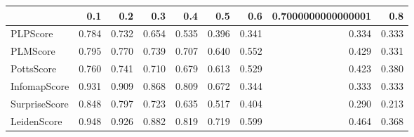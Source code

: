 \begin{tabular}{lrrrrrrrr}
\toprule
{} &   0.1 &   0.2 &   0.3 &   0.4 &   0.5 &   0.6 & 0.7000000000000001 &   0.8 \\
\midrule
PLPScore      & 0.784 & 0.732 & 0.654 & 0.535 & 0.396 & 0.341 &              0.334 & 0.333 \\
PLMScore      & 0.795 & 0.770 & 0.739 & 0.707 & 0.640 & 0.552 &              0.429 & 0.331 \\
PottsScore    & 0.760 & 0.741 & 0.710 & 0.679 & 0.613 & 0.529 &              0.423 & 0.380 \\
InfomapScore  & 0.931 & 0.909 & 0.868 & 0.809 & 0.672 & 0.344 &              0.333 & 0.333 \\
SurpriseScore & 0.848 & 0.797 & 0.723 & 0.635 & 0.517 & 0.404 &              0.290 & 0.213 \\
LeidenScore   & 0.948 & 0.926 & 0.882 & 0.819 & 0.719 & 0.599 &              0.464 & 0.368 \\
\bottomrule
\end{tabular}
